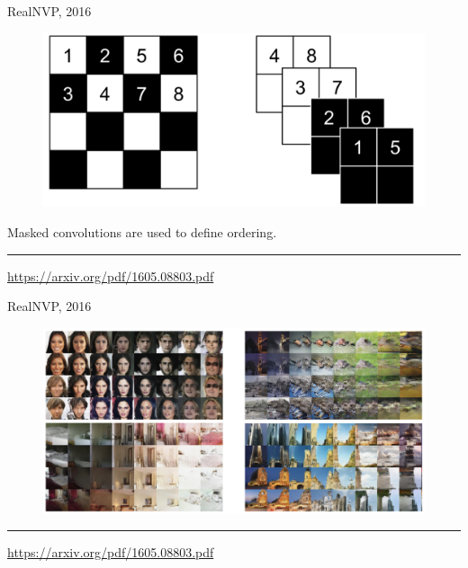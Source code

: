 \documentclass{beamer}
\begin{document}
\begin{frame}{RealNVP, 2016}
	\begin{figure}
		\centering
		\includegraphics[width=0.75\linewidth]{figs/realnvp_masking.png}
	\end{figure}
	Masked convolutions are used to define ordering.
	\vfill
	\hrule\medskip
	{\scriptsize \href{https://arxiv.org/pdf/1605.08803.pdf}{https://arxiv.org/pdf/1605.08803.pdf}} 
\end{frame}
\begin{frame}{RealNVP, 2016}
	\begin{figure}
		\centering
		\includegraphics[width=\linewidth]{figs/realnvp_output.png}
	\end{figure}
	\vfill
	\hrule\medskip
	{\scriptsize \href{https://arxiv.org/pdf/1605.08803.pdf}{https://arxiv.org/pdf/1605.08803.pdf}} 
\end{frame}
\end{document}
